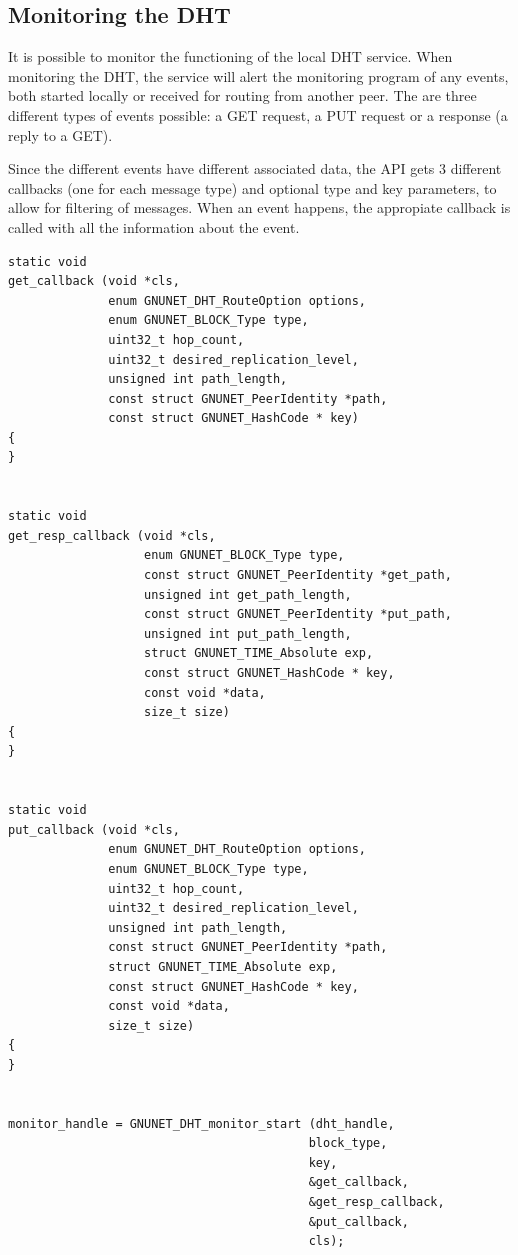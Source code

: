 \documentclass[10pt]{article}
\begin{document}
\subsection{Monitoring the DHT}
It is possible to monitor the functioning of the local DHT service. When monitoring
the DHT, the service will alert the monitoring program of any events,
both started locally or received for routing from another peer. The are three different
types of events possible: a GET request, a PUT request or a response (a reply to
a GET).

Since the different events have different associated data, the API gets 3
different callbacks (one for each message type) and optional type and key parameters,
to allow for filtering of messages. When an event happens, the appropiate callback
is called with all the information about the event.
\lstset{language=C}
\begin{lstlisting}
static void
get_callback (void *cls,
              enum GNUNET_DHT_RouteOption options,
              enum GNUNET_BLOCK_Type type,
              uint32_t hop_count,
              uint32_t desired_replication_level,
              unsigned int path_length,
              const struct GNUNET_PeerIdentity *path,
              const struct GNUNET_HashCode * key)
{
}


static void
get_resp_callback (void *cls,
                   enum GNUNET_BLOCK_Type type,
                   const struct GNUNET_PeerIdentity *get_path,
                   unsigned int get_path_length,
                   const struct GNUNET_PeerIdentity *put_path,
                   unsigned int put_path_length,
                   struct GNUNET_TIME_Absolute exp,
                   const struct GNUNET_HashCode * key,
                   const void *data,
                   size_t size)
{
}


static void
put_callback (void *cls,
              enum GNUNET_DHT_RouteOption options,
              enum GNUNET_BLOCK_Type type,
              uint32_t hop_count,
              uint32_t desired_replication_level,
              unsigned int path_length,
              const struct GNUNET_PeerIdentity *path,
              struct GNUNET_TIME_Absolute exp,
              const struct GNUNET_HashCode * key,
              const void *data,
              size_t size)
{
}


monitor_handle = GNUNET_DHT_monitor_start (dht_handle,
                                          block_type,
                                          key,
                                          &get_callback,
                                          &get_resp_callback,
                                          &put_callback,
                                          cls);
\end{lstlisting}
\end{document}
